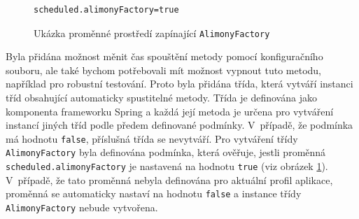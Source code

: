             \begin{figure}
                \begin{verbatim}
scheduled.alimonyFactory=true
                \end{verbatim}
                \caption{Ukázka proměnné prostředí zapínající \texttt{AlimonyFactory}} 
                \label{code:alimony-factory-true}
            \end{figure}
            Byla přidána možnost měnit čas spouštění metody pomocí konfiguračního souboru, ale také bychom potřebovali mít možnost vypnout tuto metodu, například pro robustní testování. Proto byla přidána třída, která vytváří instanci tříd obsahující automaticky spustitelné metody. Třída je definována jako komponenta frameworku Spring a každá její metoda je určena pro vytváření instancí jiných tříd podle předem definované podmínky.
            V~případě, že podmínka má hodnotu \verb|false|, příslušná třída se nevytváří.
            Pro vytváření třídy \verb|AlimonyFactory| byla definována podmínka, která ověřuje, jestli proměnná \verb|scheduled.alimonyFactory| je nastavená na hodnotu \verb|true| (viz obrázek \ref{code:alimony-factory-true}). V~případě, že tato proměnná nebyla definována pro aktuální profil aplikace, proměnná se automaticky nastaví na hodnotu \verb|false| a instance třídy \verb|AlimonyFactory| nebude vytvořena.
        
